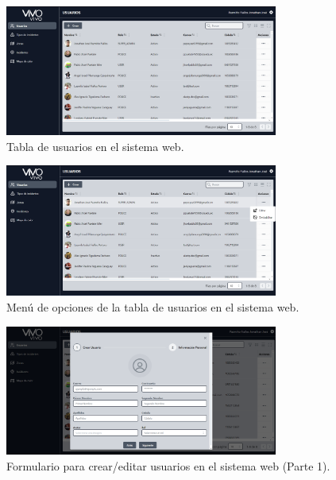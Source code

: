 \begin{figure}[H]
    \centering
    \includegraphics[width=0.8\textwidth]{chapters/III-resultados-y-discusion/resources/images/tabla-usuarios-web.png}
    \caption{Tabla de usuarios en el sistema web.}
    \label{fig:tabla-usuarios-web}
\end{figure}

\begin{figure}[H]
    \centering
    \includegraphics[width=0.8\textwidth]{chapters/III-resultados-y-discusion/resources/images/menu-tabla-usuarios-web.png}
    \caption{Menú de opciones de la tabla de usuarios en el sistema web.}
    \label{fig:menu-tabla-usuarios-web}
\end{figure}

\begin{figure}[H]
    \centering
    \includegraphics[width=0.8\textwidth]{chapters/III-resultados-y-discusion/resources/images/formulario-usuario-web-1.png}
    \caption{Formulario para crear/editar usuarios en el sistema web (Parte 1).}
    \label{fig:formulario-usuario-web-1}
\end{figure}

